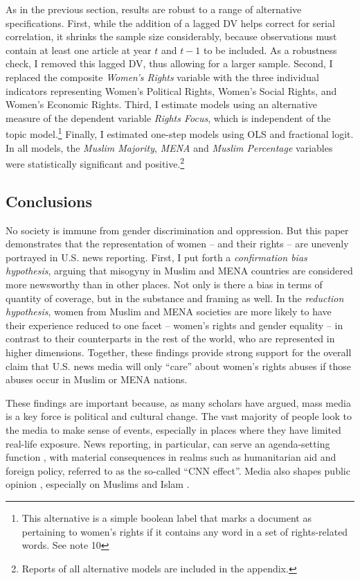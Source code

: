 \documentclass[11pt, oneside]{article}
\begin{document}
As in the previous section, results are robust to a range of alternative specifications. First, while the addition of a lagged DV helps correct for serial correlation, it shrinks the sample size considerably, because observations must contain at least one article at year $t$ and $t-1$ to be included. As a robustness check, I removed this lagged DV, thus allowing for a larger sample. Second, I replaced the composite \emph{Women's Rights} variable with the three individual indicators representing Women's Political Rights, Women's Social Rights, and Women's Economic Rights. Third, I estimate models using an alternative measure of the dependent variable \emph{Rights Focus}, which is independent of the topic model.\footnote{\hspace{5}This alternative is a simple boolean label that marks a document as pertaining to women's rights if it contains any word in a set of rights-related words. See note 10} Finally, I estimated one-step models using OLS and fractional logit. In all models,  the \emph{Muslim Majority}, \emph{MENA} and \emph{Muslim Percentage} variables were statistically significant and positive.\footnote{\hspace{5}Reports of all alternative models are included in the appendix.}

\subsection{Conclusions}

No society is immune from gender discrimination and oppression. But this paper demonstrates that the representation of women -- and their rights -- are unevenly portrayed in U.S. news reporting. First, I put forth a \emph{confirmation bias hypothesis}, arguing that misogyny in Muslim and MENA countries are considered more newsworthy than in other places. Not only is there a bias in terms of quantity of coverage, but in the substance and framing as well. In the \emph{reduction hypothesis}, women from Muslim and MENA societies are more likely to have their experience reduced to one facet -- women's rights and gender equality -- in contrast to their counterparts in the rest of the world, who are represented in higher dimensions. Together, these findings provide strong support for the overall claim that U.S. news media will only ``care'' about women's rights abuses if those abuses occur in Muslim or MENA nations. 

These findings are important because, as many scholars have argued, mass media is a key force is political and cultural change. The vast majority of people look to the media to make sense of events, especially in places where they have limited real-life exposure. News reporting, in particular, can serve an agenda-setting function \cite{mccombs_agenda-setting_1972}, with material consequences in realms such as humanitarian aid and foreign policy, referred to as the so-called ``CNN effect''\cite {robinson_cnn_1999,robinson_theorizing_2001,baum_relationships_2008}. Media also shapes public opinion \cite{gamson1989media,kinder_communication_1998}, especially on Muslims and Islam \cite{bail2012fringe,mcalister_epic_2001,said_covering_2008}. 
\end{document}

